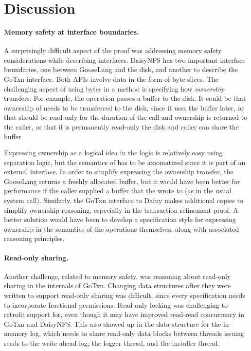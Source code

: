 \section{Discussion}

\paragraph{Memory safety at interface boundaries.}
A surprisingly difficult aspect of the proof was addressing memory safety
considerations while describing interfaces.
DaisyNFS has two important interface boundaries, one between GooseLang and the
disk, and another to describe the GoTxn interface. Both APIs involve data in the
form of byte slices. The challenging aspect of using bytes in a method is
specifying how \emph{ownership} transfers. For example, the 
operation passes a buffer  to the disk. It could be that ownership of
 needs to be transferred to the disk, since it uses the buffer later, or
that  should be read-only for the duration of the call and ownership is
returned to the caller, or that if  is permanently read-only the disk and
caller can share the buffer.

Expressing ownership as a logical idea in the logic is relatively easy using
separation logic, but the semantics of  has to be
axiomatized since it is part of an external interface. In order to simplify expressing the ownership transfer, the
GooseLang  returns a freshly allocated buffer, but it would have
been better for performance if the caller supplied a buffer that the
 wrote to (as in the usual  system call). Similarly, the
GoTxn interface to Dafny makes additional copies to simplify ownership
reasoning, especially in the transaction refinement proof. A better solution would
have been to develop a specification style for expressing ownership in the
semantics of the operations themselves, along with associated reasoning
principles.

\paragraph{Read-only sharing.}
Another challenge, related to memory safety, was reasoning about read-only
sharing in the internals of GoTxn. Changing data structures after they were written to support read-only
sharing was difficult, since every specification needs to incorporate fractional
permissions. Read-only locking was challenging to retrofit support for, even
though it may have improved read-read concurrency in GoTxn and DaisyNFS. This
also showed up in the data structure for the in-memory log, which needs to share
read-only data blocks between threads issuing reads to the write-ahead log, the logger
thread, and the installer thread.

